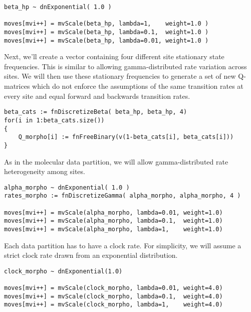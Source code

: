 {\tt \begin{snugshade*}
\begin{lstlisting}
beta_hp ~ dnExponential( 1.0 )

moves[mvi++] = mvScale(beta_hp, lambda=1,    weight=1.0 )
moves[mvi++] = mvScale(beta_hp, lambda=0.1,  weight=1.0 )
moves[mvi++] = mvScale(beta_hp, lambda=0.01, weight=1.0 )
\end{lstlisting}
\end{snugshade*}}

Next, we'll create a vector containing four different site stationary state frequencies. 
This is similar to allowing gamma-distributed rate variation across sites. 
We will then use these stationary frequencies to generate a set of new Q-matrices which do not enforce the assumptions of the same transition rates at every site and equal forward and backwards transition rates.

{\tt \begin{snugshade*}
\begin{lstlisting}
beta_cats := fnDiscretizeBeta( beta_hp, beta_hp, 4)
for(i in 1:beta_cats.size())
{
    Q_morpho[i] := fnFreeBinary(v(1-beta_cats[i], beta_cats[i]))
}
\end{lstlisting}
\end{snugshade*}}


As in the molecular data partition, we will allow gamma-distributed rate heterogeneity among sites.
{\tt \begin{snugshade*}
\begin{lstlisting}
alpha_morpho ~ dnExponential( 1.0 )
rates_morpho := fnDiscretizeGamma( alpha_morpho, alpha_morpho, 4 )

moves[mvi++] = mvScale(alpha_morpho, lambda=0.01, weight=1.0)
moves[mvi++] = mvScale(alpha_morpho, lambda=0.1,  weight=1.0)
moves[mvi++] = mvScale(alpha_morpho, lambda=1,    weight=1.0)
\end{lstlisting}
\end{snugshade*}}

Each data partition has to have a clock rate. For simplicity, we will assume a strict clock rate drawn from an exponential distribution.

{\tt \begin{snugshade*}
\begin{lstlisting}
clock_morpho ~ dnExponential(1.0)

moves[mvi++] = mvScale(clock_morpho, lambda=0.01, weight=4.0)
moves[mvi++] = mvScale(clock_morpho, lambda=0.1,  weight=4.0)
moves[mvi++] = mvScale(clock_morpho, lambda=1,    weight=4.0)
\end{lstlisting}
\end{snugshade*}}

